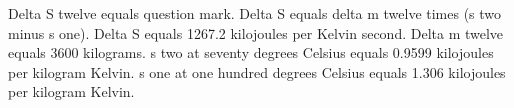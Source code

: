 Delta S twelve equals question mark.
Delta S equals delta m twelve times (s two minus s one).
Delta S equals 1267.2 kilojoules per Kelvin second.
Delta m twelve equals 3600 kilograms.
s two at seventy degrees Celsius equals 0.9599 kilojoules per kilogram Kelvin.
s one at one hundred degrees Celsius equals 1.306 kilojoules per kilogram Kelvin.